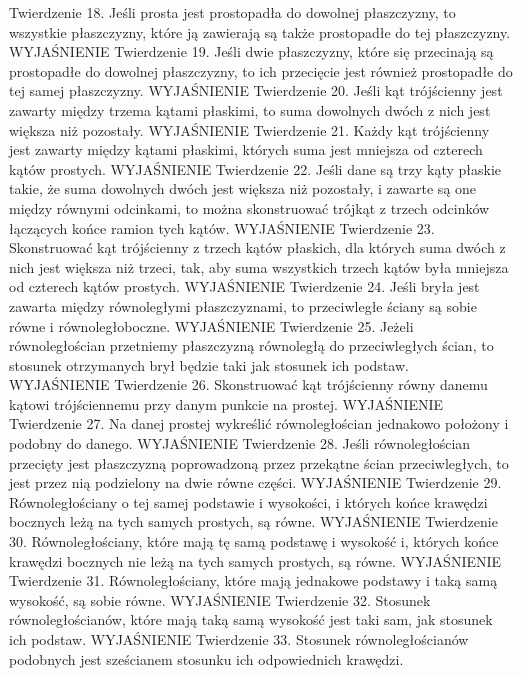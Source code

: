 Twierdzenie 18.
    Jeśli prosta jest prostopadła do dowolnej płaszczyzny, to wszystkie płaszczyzny, które ją zawierają są także prostopadłe do tej płaszczyzny.
    WYJAŚNIENIE
Twierdzenie 19.
    Jeśli dwie płaszczyzny, które się przecinają są prostopadłe do dowolnej płaszczyzny, to ich przecięcie jest również prostopadłe do tej samej płaszczyzny.
    WYJAŚNIENIE
Twierdzenie 20.
    Jeśli kąt trójścienny jest zawarty między trzema kątami płaskimi, to suma dowolnych dwóch z nich jest większa niż pozostały.
    WYJAŚNIENIE
Twierdzenie 21.
    Każdy kąt trójścienny jest zawarty między kątami płaskimi, których suma jest mniejsza od czterech kątów prostych.
    WYJAŚNIENIE
Twierdzenie 22.
    Jeśli dane są trzy kąty płaskie takie, że suma dowolnych dwóch jest większa niż pozostały, i zawarte są one między równymi odcinkami, to można skonstruować trójkąt z trzech odcinków łączących końce ramion tych kątów.
    WYJAŚNIENIE
Twierdzenie 23.
    Skonstruować kąt trójścienny z trzech kątów płaskich, dla których suma dwóch z nich jest większa niż trzeci, tak, aby suma wszystkich trzech kątów była mniejsza od czterech kątów prostych.
    WYJAŚNIENIE
Twierdzenie 24.
    Jeśli bryła jest zawarta między równoległymi płaszczyznami, to przeciwległe ściany są sobie równe i równoległoboczne.
    WYJAŚNIENIE
Twierdzenie 25.
    Jeżeli równoległościan przetniemy płaszczyzną równoległą do przeciwległych ścian, to stosunek otrzymanych brył będzie taki jak stosunek ich podstaw.
    WYJAŚNIENIE
Twierdzenie 26.
    Skonstruować kąt trójścienny równy danemu kątowi trójściennemu przy danym punkcie na prostej.
    WYJAŚNIENIE
Twierdzenie 27.
    Na danej prostej wykreślić równoległościan jednakowo położony i podobny do danego.
    WYJAŚNIENIE
Twierdzenie 28.
    Jeśli równoległościan przecięty jest płaszczyzną poprowadzoną przez przekątne ścian przeciwległych, to jest przez nią podzielony na dwie równe części.
    WYJAŚNIENIE
Twierdzenie 29.
    Równoległościany o tej samej podstawie i wysokości, i których końce krawędzi bocznych leżą na tych samych prostych, są równe.
    WYJAŚNIENIE
Twierdzenie 30.
    Równoległościany, które mają tę samą podstawę i wysokość i, których końce krawędzi bocznych nie leżą na tych samych prostych, są równe.
    WYJAŚNIENIE
Twierdzenie 31.
    Równoległościany, które mają jednakowe podstawy i taką samą wysokość, są sobie równe.
    WYJAŚNIENIE
Twierdzenie 32.
    Stosunek równoległościanów, które mają taką samą wysokość jest taki sam, jak stosunek ich podstaw.
    WYJAŚNIENIE
Twierdzenie 33.
    Stosunek równoległościanów podobnych jest sześcianem stosunku ich odpowiednich krawędzi.
